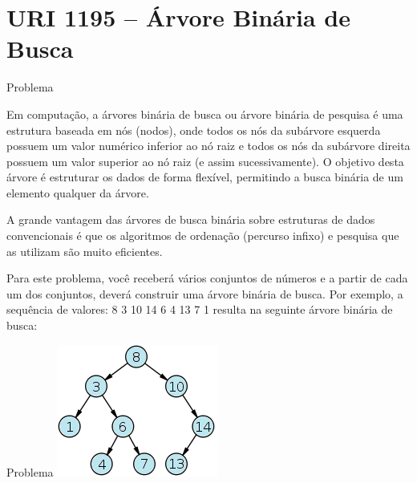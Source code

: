 \section{URI 1195 -- Árvore Binária de Busca}

\begin{frame}[fragile]{Problema}

Em computação, a árvores binária de busca ou árvore binária de pesquisa é uma estrutura baseada em nós (nodos), onde todos os nós da subárvore esquerda possuem um valor numérico inferior ao nó raiz e todos os nós da subárvore direita possuem um valor superior ao nó raiz (e assim sucessivamente). O objetivo desta árvore é estruturar os dados de forma flexível, permitindo a busca binária de um elemento qualquer da árvore.

A grande vantagem das árvores de busca binária sobre estruturas de dados convencionais é que os algoritmos de ordenação (percurso infixo) e pesquisa que as utilizam são muito eficientes.

Para este problema, você receberá vários conjuntos de números e a partir de cada um dos conjuntos, deverá construir uma árvore binária de busca. Por exemplo, a sequência de valores: 8 3 10 14 6 4 13 7 1 resulta na seguinte árvore binária de busca:

\end{frame}


\begin{frame}[fragile]{Problema}
    \includegraphics[scale=1,center]{figures/UOJ_1195.png}
\end{frame}

